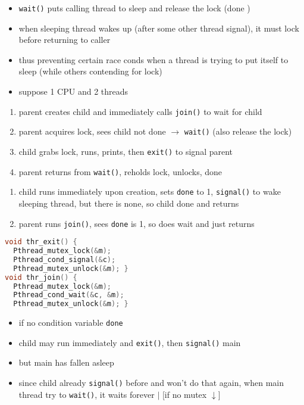 \begin{minipage}{.44\linewidth}
  \flushleft
  \begin{itemize}
  \item \texttt{wait()} puts calling thread to sleep and release the lock (done )
  \item when sleeping thread wakes up (after some other thread signal), it must  lock before returning to caller
  \item thus preventing certain race conds when a thread is trying to put itself to sleep (while others contending for lock)
  \item suppose 1 CPU and 2 threads
  \end{itemize}
  \begin{enumerate}
  \item parent creates child and immediately calls \texttt{join()} to wait for child
  \item parent acquires lock, sees child not done $\to$ \texttt{wait()} (also release the lock)
  \item child grabs lock, runs, prints, then \texttt{exit()} to signal parent
  \item parent returns from \texttt{wait()}, reholds lock, unlocks, done
  \end{enumerate}
\end{minipage}
\begin{enumerate}
\item child runs immediately upon creation, sets \texttt{done} to 1, \texttt{signal()} to wake sleeping thread, but there is none, so child done and returns
\item parent runs \texttt{join()}, sees \texttt{done} is 1, so does  wait and just returns
\end{enumerate}
\begin{minipage}{.5\linewidth}
\begin{lstlisting}[language=c,xrightmargin=2pt]
void thr_exit() {
  Pthread_mutex_lock(&m);
  Pthread_cond_signal(&c);
  Pthread_mutex_unlock(&m); }
void thr_join() {
  Pthread_mutex_lock(&m);
  Pthread_cond_wait(&c, &m);
  Pthread_mutex_unlock(&m); }
\end{lstlisting}
\end{minipage}
\begin{minipage}{.5\linewidth}
  \flushleft
  \begin{itemize}
  \item if no condition variable \texttt{done}
  \item child may run immediately and \texttt{exit()}, then \texttt{signal()} main
  \item but main has  fallen asleep
  \item since child already \texttt{signal()} before and won't do that again, when main thread try to \texttt{wait()}, it waits forever $|$ [if no mutex $\downarrow$]
  \end{itemize}
\end{minipage}
